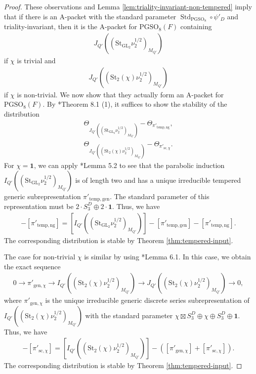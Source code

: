 \documentclass[12pt]{amsart}
\theoremstyle{definition}
\theoremstyle{plain}
\theoremstyle{remark}
\def\GL{\mathrm{GL}}
\def\PGSO{\mathrm{PGSO}}
\DeclareMathOperator{\Std}{Std}
\numberwithin{equation}{section}
\newcommand{\temp}{\mathrm{temp}}
\newcommand{\gen}{\mathrm{gen}}
\newcommand{\St}{\mathrm{St}}
\begin{document}
\begin{proof}
      These observations and Lemma \ref{lem:triality-invariant-non-tempered} imply that if there is an A-packet with the standard parameter $\Std_{\PGSO_8} \circ \psi'_D$ and triality-invariant, then it is the A-packet for $\PGSO_8(F)$ containing 
      \begin{align*}
             J_{Q'}((\St_{\GL_2} \nu_2^{1/2})_{M_{Q'}})
      \end{align*}
      if $\chi$ is trivial and
      \begin{align*}
             J_{Q'}((\St_{2}(\chi) \nu_2^{1/2})_{M_{Q'}})
      \end{align*}
      if $\chi$ is non-trivial.
      We now show that they actually form an A-packet for $\PGSO_8(F)$.
      By \cite{Xu2024-ArthurPacketsQuasisplitGSp2nGO2n}*{Theorem 8.1 (1)}, it suffices to show the stability of the distribution
      \begin{align*}
            \Theta_{J_{Q'}((\St_{\GL_2} \nu_2^{1/2})_{M_{Q'}})} - \Theta_{\pi'_{\temp, \mathrm{ng}}}, \\
            \Theta_{J_{Q'}((\St_{2}(\chi) \nu_2^{1/2})_{M_{Q'}})} - \Theta_{\pi'_{\mathrm{sc}, \chi}}.
      \end{align*}
      For $\chi = \mathbf{1}$, we can apply \cite{Muic2005-ReducibilityGeneralizedPrincipalSeries}*{Lemma 5.2} to see that the parabolic induction $I_{Q'}((\St_{\GL_2} \nu_2^{1/2})_{M_{Q'}})$ is of length two and has a unique irreducible tempered generic subrepresentation $\pi'_{\temp, \gen}$.
      The standard parameter of this representation must be $2 \cdot S_3^D \oplus 2 \cdot \mathbf{1}$.
      Thus, we have 
      \begin{align*}
            [J_{Q'}((\St_{\GL_2} \nu_2^{1/2})_{M_{Q'}})] - [\pi'_{\temp, \mathrm{ng}}]
            = 
            [I_{Q'}((\St_{\GL_2} \nu_2^{1/2})_{M_{Q'}})] - [\pi'_{\temp, \gen}] - [\pi'_{\temp, \mathrm{ng}}].
      \end{align*}
      The corresponding distribution is stable by Theorem \ref{thm:tempered-input}.

      The case for non-trivial $\chi$ is similar by using \cite{Muic2005-ReducibilityStandardRepresentations}*{Lemma 6.1}.
      In this case, we obtain the exact sequence
      \begin{align*}
            0 \to \pi'_{\gen, \chi} \to I_{Q'}((\St_{2}(\chi) \nu_2^{1/2})_{M_{Q'}}) \to J_{Q'}((\St_{2}(\chi) \nu_2^{1/2})_{M_{Q'}}) \to 0,
      \end{align*}
      where $\pi'_{\gen, \chi}$ is the unique irreducible generic discrete series subrepresentation of $I_{Q'}((\St_{2}(\chi) \nu_2^{1/2})_{M_{Q'}})$ with the standard parameter $\chi \boxtimes S_3^D \oplus \chi \oplus S_3^D \oplus \mathbf{1}$.
      Thus, we have 
      \begin{align*}
            [J_{Q'}((\St_{2}(\chi) \nu_2^{1/2})_{M_{Q'}})] - [\pi'_{\mathrm{sc}, \chi}] 
            =
            [I_{Q'}((\St_{2}(\chi) \nu_2^{1/2})_{M_{Q'}})] - ([\pi'_{\gen, \chi}] + [\pi'_{\mathrm{sc}, \chi}]).
      \end{align*}
      The corresponding distribution is stable by Theorem \ref{thm:tempered-input}.
\end{proof}
\end{document}
